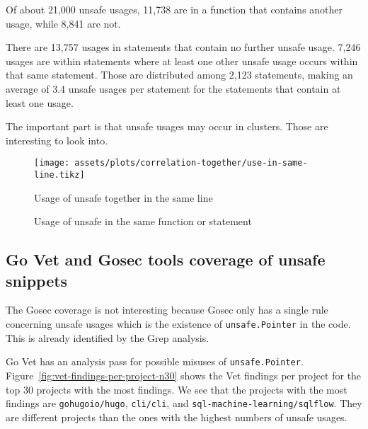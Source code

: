 Of about 21,000 unsafe usages, 11,738 are in a function that contains another usage, while 8,841 are not.

There are 13,757 usages in statements that contain no further unsafe usage.
7,246 usages are within statements where at least one other unsafe usage occurs within that same statement.
Those are distributed among 2,123 statements, making an average of 3.4 unsafe usages per statement for the statements
that contain at least one usage.

The important part is that unsafe usages may occur in clusters.
Those are interesting to look into.

\begin{figure}[ht]
    \centering
    {\scriptsize \texttt{[image: assets/plots/correlation-together/use-in-same-line.tikz]}}
    \caption{Usage of unsafe together in the same line}
    \label{fig:correlations-unsafe-usage-same-line}
\end{figure}

\begin{figure}[ht]
    \centering
    \caption{Usage of unsafe in the same function or statement}
    \label{fig:correlations-unsafe-usage-same-function-and-statement}
\end{figure}



\subsection{Go Vet and Gosec tools coverage of unsafe snippets}\label{subsec:results-vet-gosec}

The Gosec coverage is not interesting because Gosec only has a single rule concerning unsafe usages which is the
existence of \texttt{unsafe.Pointer} in the code.
This is already identified by the Grep analysis.

Go Vet has an analysis pass for possible misuses of \texttt{unsafe.Pointer}.
Figure~\ref{fig:vet-findings-per-project-n30} shows the Vet findings per project for the top 30 projects with the most
findings.
We see that the projects with the most findings are \texttt{gohugoio/hugo}, \texttt{cli/cli},
and \texttt{sql-machine-learning/sqlflow}.
They are different projects than the ones with the highest numbers of unsafe usages.


